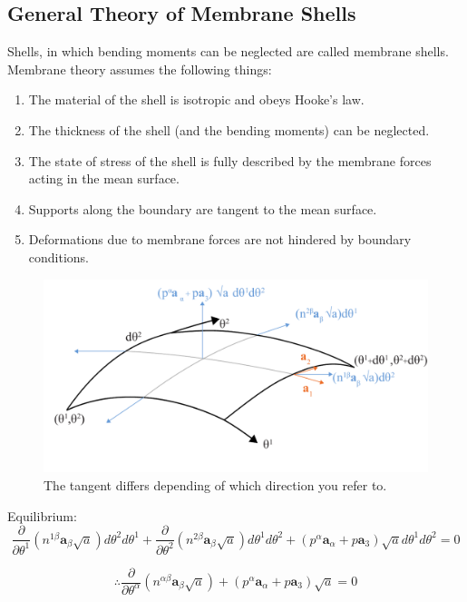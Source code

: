 \subsection{General Theory of Membrane Shells}


Shells, in which bending moments can be neglected are called membrane
shells. Membrane theory assumes the following things:

\begin{enumerate}
\item The material of the shell is isotropic and obeys Hooke's law.
\item The thickness of the shell (and the bending moments) can be neglected.
\item The state of stress of the shell is fully described by the membrane
forces acting in the mean surface.
\item Supports along the boundary are tangent to the mean surface.
\item Deformations due to membrane forces are not hindered by boundary
conditions.
\end{enumerate}

\begin{figure}[H]
\centering
\includegraphics[width=0.9\linewidth ]{figure/Theory/membraneDefinition.pdf}
\caption{The tangent differs depending of which direction you refer to. }
\end{figure}


Equilibrium: 
\begin{equation}
\frac{\partial}{\partial \theta^1}(n^{1 \beta}\textbf{a}_{\beta} \sqrt{a}) d\theta^2 d\theta^1 + \frac{\partial}{\partial \theta^2}(n^{2 \beta}\textbf{a}_{\beta} \sqrt{a}) d\theta^1 d\theta^2 + ( p^{\alpha}\textbf{a}_\alpha + p\textbf{a}_3)\sqrt{a} d\theta^1 d\theta^2  = 0
\end{equation}



\begin{equation} \label{membraneEq}
\therefore  \frac{\partial}{\partial \theta^ \alpha} (n^{\alpha \beta} \textbf{a}_\beta \sqrt{ a}) + ( p^{\alpha}\textbf{a}_\alpha + p\textbf{a}_3)\sqrt{a} = 0
\end{equation}

